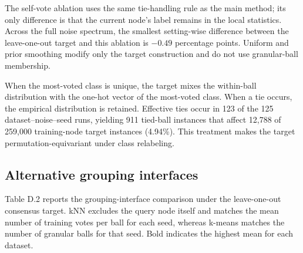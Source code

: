 \documentclass[preprint,12pt]{elsarticle}
\begin{document}
The self-vote ablation uses the same tie-handling rule as the main method; its only difference is that the current node's label remains in the local statistics. Across the full noise spectrum, the smallest setting-wise difference between the leave-one-out target and this ablation is \(- 0.49\) percentage points. Uniform and prior smoothing modify only the target construction and do not use granular-ball membership.

When the most-voted class is unique, the target mixes the within-ball distribution with the one-hot vector of the most-voted class. When a tie occurs, the empirical distribution is retained. Effective ties occur in 123 of the 125 dataset--noise--seed runs, yielding 911 tied-ball instances that affect 12,788 of 259,000 training-node target instances (4.94\%). This treatment makes the target permutation-equivariant under class relabeling.

\Needspace{352pt}

\subsection{Alternative grouping interfaces}\label{sec:D.2}

Table D.2 reports the grouping-interface comparison under the leave-one-out consensus target. kNN excludes the query node itself and matches the mean number of training votes per ball for each seed, whereas k-means matches the number of granular balls for that seed. Bold indicates the highest mean for each dataset.
\end{document}
